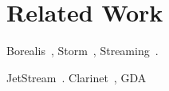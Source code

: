 \section{Related Work}
\label{sec:related-work}

Borealis~\cite{abadi2005design}, Storm~\cite{toshniwal2014storm},
Streaming~\cite{zaharia2012discretized}.

JetStream~\cite{rabkin2014aggregation}.
Clarinet~\cite{viswanathan2016clarinet}, GDA~\cite{pu2015low}

